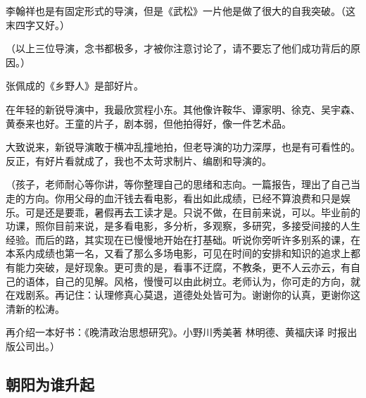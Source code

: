 \par 李翰祥也是有固定形式的导演，但是《武松》一片他是做了很大的自我突破。（这末四字又好。）
\par （以上三位导演，念书都极多，才被你注意讨论了，请不要忘了他们成功背后的原因。）
\par 张佩成的《乡野人》是部好片。
\par 在年轻的新锐导演中，我最欣赏程小东。其他像许鞍华、谭家明、徐克、吴宇森、黄泰来也好。王童的片子，剧本弱，但他拍得好，像一件艺术品。
\par 大致说来，新锐导演敢于横冲乱撞地拍，但老导演的功力深厚，也是有可看性的。反正，有好片看就成了，我也不太苛求制片、编剧和导演的。
\par （孩子，老师耐心等你讲，等你整理自己的思绪和志向。一篇报告，理出了自己当走的方向。你用父母的血汗钱去看电影，看出如此成绩，已经不算浪费和只是娱乐。可是还是要乖，暑假再去工读才是。只说不做，在目前来说，可以。毕业前的功课，照你目前来说，是多看电影，多分析，多观察，多研究，多接受间接的人生经验。而后的路，其实现在已慢慢地开始在打基础。听说你旁听许多别系的课，在本系内成绩也第一名，又看了那么多场电影，可见在时间的安排和知识的追求上都有能力突破，是好现象。更可贵的是，看事不迂腐，不教条，更不人云亦云，有自己的语体，自己的见解。风格，慢慢可以由此树立。老师认为，你可走的方向，就在戏剧系。再记住：认理修真心莫退，道德处处皆可为。谢谢你的认真，更谢你这清新的松涛。
\par 再介绍一本好书：《晚清政治思想研究》。小野川秀美著 林明德、黄福庆译 时报出版公司出。）



\subsection{朝阳为谁升起}

